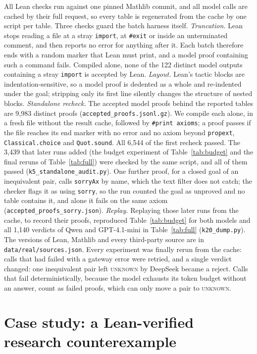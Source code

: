 \documentclass[10pt]{article}
\theoremstyle{definition}
\newcommand{\V}[1]{\textsc{#1}}
\begin{document}
All Lean checks run against one pinned Mathlib commit, and all model calls are cached by
their full request, so every table is regenerated from the cache by one script per table. Three
checks guard the batch harness itself.
\emph{Truncation.} Lean stops reading a file at a stray \texttt{import}, at \texttt{\#exit} or
inside an unterminated comment, and then reports no error for anything after it. Each batch
therefore ends with a random marker that Lean must print, and a model proof containing such a
command fails. Compiled alone, none of the 122 distinct model outputs containing a stray
\texttt{import} is accepted by Lean.
\emph{Layout.} Lean's tactic blocks are indentation-sensitive, so a model proof is dedented as a
whole and re-indented under the goal; stripping only its first line silently changes the
structure of nested blocks.
\emph{Standalone recheck.} The accepted model proofs behind the reported tables are 9,983
distinct proofs (\texttt{accepted\_proofs.jsonl.gz}). We compile each alone, in a fresh file
without the result cache, followed by \texttt{\#print axioms}; a proof passes if the file reaches
its end marker with no error and no axiom beyond \texttt{propext}, \texttt{Classical.choice} and
\texttt{Quot.sound}. All 6,544 of the first recheck passed. The 3,439 that later runs added (the
budget experiment of Table~\ref{tab:budget} and the final reruns of Table~\ref{tab:full}) were
checked by the same script, and all of them passed (\texttt{k5\_standalone\_audit.py}). One
further proof, for a closed goal of an inequivalent pair, calls \texttt{sorryAx} by name, which
the text filter does not catch; the checker flags it as using \texttt{sorry}, so the run counted
the goal as unproved and no table contains it, and alone it fails on the same axiom
(\texttt{accepted\_proofs\_sorry.json}).
\emph{Replay.} Replaying those later runs from the cache, to record their proofs, reproduced
Table~\ref{tab:budget} for both models and all 1,140 verdicts of Qwen and GPT-4.1-mini in
Table~\ref{tab:full} (\texttt{k20\_dump.py}). The versions of Lean, Mathlib and every
third-party source are in \texttt{data/real/sources.json}.
Every experiment was finally rerun from the cache: calls that had failed with a gateway error
were retried, and a single verdict changed: one inequivalent pair left \V{unknown} by DeepSeek
became a reject. Calls that fail deterministically, because the model exhausts its token budget
without an answer, count as failed proofs, which can only move a pair to \V{unknown}.

\section{Case study: a Lean-verified research counterexample}\label{app:kaplansky}
\end{document}
